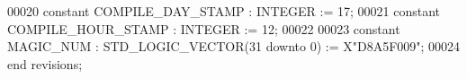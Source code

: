 \begin{DoxyCode}
00020     \textcolor{keywordflow}{constant} \textcolor{vhdlchar}{COMPILE_DAY_STAMP} \textcolor{vhdlchar}{:} \textcolor{comment}{INTEGER} \textcolor{vhdlchar}{:=} \textcolor{vhdllogic}{}\textcolor{vhdllogic}{17};
00021     \textcolor{keywordflow}{constant} \textcolor{vhdlchar}{COMPILE_HOUR_STAMP} \textcolor{vhdlchar}{:} \textcolor{comment}{INTEGER} \textcolor{vhdlchar}{:=} \textcolor{vhdllogic}{}\textcolor{vhdllogic}{12};
00022     
00023     \textcolor{keywordflow}{constant} \textcolor{vhdlchar}{MAGIC_NUM} \textcolor{vhdlchar}{:} \textcolor{comment}{STD\_LOGIC\_VECTOR}\textcolor{vhdlchar}{(}\textcolor{vhdllogic}{}\textcolor{vhdllogic}{31} \textcolor{keywordflow}{downto} \textcolor{vhdllogic}{}\textcolor{vhdllogic}{0}\textcolor{vhdlchar}{)} \textcolor{vhdlchar}{:=} \textcolor{vhdlchar}{X}\textcolor{keyword}{"D8A5F009"};
00024 \textcolor{keywordflow}{end} \textcolor{vhdlchar}{revisions};
\end{DoxyCode}
